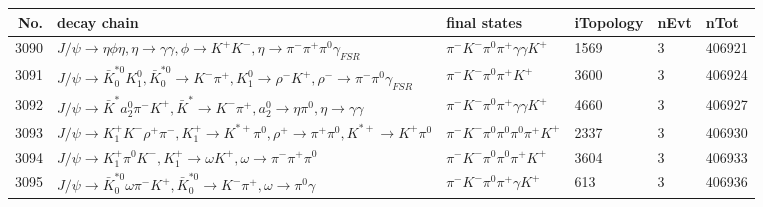 \begin{table}[htbp] 
\begin{center}
\begin{small}
\begin{tabular}{rlllll}\hline\hline
 No. & decay chain & final states &  iTopology & nEvt & nTot \\\hline
3090&$J/\psi       \rightarrow \eta          \phi           \eta          , \eta           \rightarrow \gamma       \gamma       , \phi            \rightarrow K^{+}          K^{-}          , \eta           \rightarrow \pi^{-}        \pi^{+}        \pi^{0}        \gamma_{FSR} $&$\pi^{-}        K^{-}          \pi^{0}        \pi^{+}        \gamma       \gamma       K^{+}          $& 1569&    3&406921\\
3091&$J/\psi       \rightarrow \bar{K}_0^{*0}K_1^{0}        , \bar{K}_0^{*0} \rightarrow K^{-}          \pi^{+}        , K_1^{0}         \rightarrow \rho^{-}      K^{+}          , \rho^{-}       \rightarrow \pi^{-}        \pi^{0}        \gamma_{FSR} $&$\pi^{-}        K^{-}          \pi^{0}        \pi^{+}        K^{+}          $& 3600&    3&406924\\
3092&$J/\psi       \rightarrow \bar{K}^{*}   a_{2}^{0}      \pi^{-}        K^{+}          , \bar{K}^{*}    \rightarrow K^{-}          \pi^{+}        , a_{2}^{0}       \rightarrow \eta          \pi^{0}        , \eta           \rightarrow \gamma       \gamma       $&$\pi^{-}        K^{-}          \pi^{0}        \pi^{+}        \gamma       \gamma       K^{+}          $& 4660&    3&406927\\
3093&$J/\psi       \rightarrow K_1^{+}        K^{-}          \rho^{+}      \pi^{-}        , K_1^{+}         \rightarrow K^{*+}         \pi^{0}        , \rho^{+}       \rightarrow \pi^{+}        \pi^{0}        , K^{*+}          \rightarrow K^{+}          \pi^{0}        $&$\pi^{-}        K^{-}          \pi^{0}        \pi^{0}        \pi^{0}        \pi^{+}        K^{+}          $& 2337&    3&406930\\
3094&$J/\psi       \rightarrow K_1^{+}        \pi^{0}        K^{-}          , K_1^{+}         \rightarrow \omega         K^{+}          , \omega          \rightarrow \pi^{-}        \pi^{+}        \pi^{0}        $&$\pi^{-}        K^{-}          \pi^{0}        \pi^{0}        \pi^{+}        K^{+}          $& 3604&    3&406933\\
3095&$J/\psi       \rightarrow \bar{K}_0^{*0}\omega         \pi^{-}        K^{+}          , \bar{K}_0^{*0} \rightarrow K^{-}          \pi^{+}        , \omega          \rightarrow \pi^{0}        \gamma       $&$\pi^{-}        K^{-}          \pi^{0}        \pi^{+}        \gamma       K^{+}          $&  613&    3&406936\\

\end{tabular}
\end{small}
\end{center}
\end{table}
